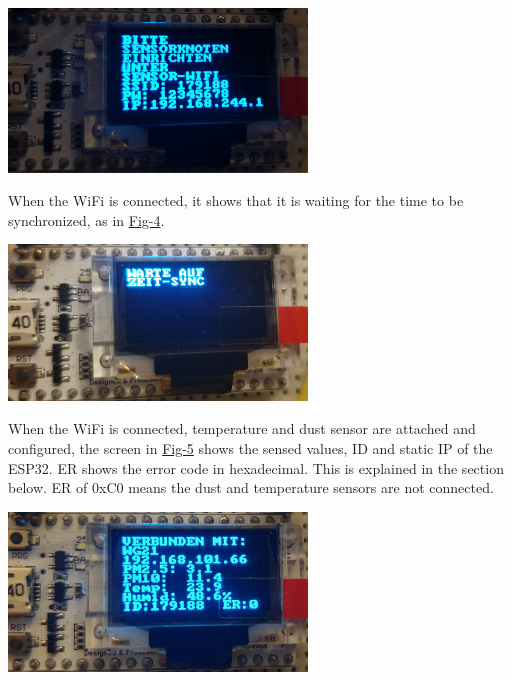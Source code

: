 \begin{DoxyItemize}
\begin{DoxyEnumerate}
\begin{DoxyImage}
\includegraphics[width=300px]{apmode}
\end{DoxyImage}

\item When the Wi\+Fi is connected, it shows that it is waiting for the time to be synchronized, as in \mbox{\hyperlink{index_Fig-4}{Fig-\/4}}. \label{index_Fig-4}%
%
  
\begin{DoxyImage}
\includegraphics[width=300px]{syncwait}
\end{DoxyImage}

\item When the Wi\+Fi is connected, temperature and dust sensor are attached and configured, the screen in \mbox{\hyperlink{index_Fig-5}{Fig-\/5}} shows the sensed values, ID and static IP of the E\+S\+P32. ER shows the error code in hexadecimal. This is explained in the section below. ER of 0x\+C0 means the dust and temperature sensors are not connected. \label{index_Fig-5}%
%
  
\begin{DoxyImage}
\includegraphics[width=300px]{screen1}
\end{DoxyImage}


\end{DoxyEnumerate}
\end{DoxyItemize}
